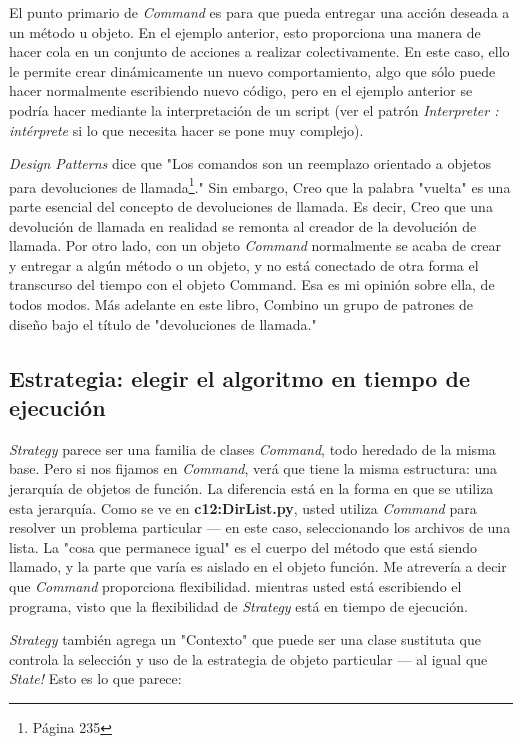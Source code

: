 El punto primario de \textit{Command} es para que pueda entregar una acción deseada a un método u objeto. En el ejemplo anterior, esto proporciona una manera de hacer cola en un conjunto de acciones a realizar colectivamente. En este caso, ello le permite crear dinámicamente un nuevo comportamiento, algo que sólo puede hacer normalmente escribiendo nuevo código, pero en el ejemplo anterior se podría hacer mediante la interpretación de un script (ver el patrón \textit{Interpreter : intérprete} si lo que necesita hacer se pone muy complejo). \newline

\textit{Design Patterns} dice que "Los comandos son un reemplazo orientado a objetos para devoluciones de llamada\footnote{Página 235}." Sin embargo, Creo que la palabra "vuelta" es una parte esencial del concepto de devoluciones de llamada. Es decir, Creo que una devolución de llamada en realidad se remonta al creador de la devolución de llamada. Por otro lado, con un objeto \textit{Command} normalmente se acaba de crear y entregar a algún método o un objeto,  y no está conectado de otra forma el transcurso del tiempo con el objeto Command. Esa es mi opinión sobre ella, de todos modos. Más adelante en este libro, Combino un grupo de patrones de diseño bajo el título de "devoluciones de llamada."  \newline

\subsection*{Estrategia: elegir el algoritmo en tiempo de ejecución}
\label{subsec:eeeaetde}


\textit{Strategy} parece ser una familia de clases \textit{Command}, todo heredado de la misma base. Pero si nos fijamos en \textit{Command}, verá que tiene la misma estructura: una jerarquía de objetos de función. La diferencia está en la forma en que se utiliza esta jerarquía. Como se ve en \textbf{c12:DirList.py}, usted utiliza \textit{Command} para resolver un problema particular — en este caso, seleccionando los archivos de una lista. La "cosa que permanece igual" es el cuerpo del método que está siendo llamado, y la parte que varía es aislado en el objeto función. Me atrevería a decir que \textit{Command} proporciona flexibilidad. mientras usted está escribiendo el programa, visto que la flexibilidad de \textit{Strategy} está en tiempo de ejecución. 

\textit{Strategy} también agrega un "Contexto" que puede ser una clase sustituta que controla la selección y uso de la estrategia de objeto particular — al igual que \textit{State!} Esto es lo que parece:   \newpage

